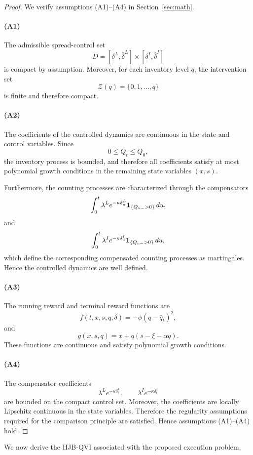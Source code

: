 \documentclass[12pt]{article}
\begin{document}
\begin{proof}
We verify assumptions (A1)--(A4) in Section~\ref{sec:math}.

\paragraph{(A1)}
The admissible spread-control set
\[
D=
[\underline\delta^L,\overline\delta^L]
\times
[\underline\delta^I,\overline\delta^I]
\]
is compact by assumption.
Moreover, for each inventory level $q$, the intervention set
\[
\mathcal Z(q)
=
\{0,1,\ldots,q\}
\]
is finite and therefore compact.

\paragraph{(A2)}
The coefficients of the controlled dynamics are continuous in the state and control variables.
Since
\[
0\le Q_t\le Q_0,
\]
the inventory process is bounded, and therefore all coefficients satisfy at most polynomial growth conditions in the remaining state variables $(x,s)$.

Furthermore, the counting processes are characterized through the compensators
\[
\int_0^t
\lambda^L e^{-\kappa\delta^L_u}
{\bf 1}_{\{Q_{u-}>0\}}
\,du,
\]
and
\[
\int_0^t
\lambda^I e^{-\kappa\delta^I_u}
{\bf 1}_{\{Q_{u-}>0\}}
\,du,
\]
which define the corresponding compensated counting processes as martingales.
Hence the controlled dynamics are well defined.

\paragraph{(A3)}
The running reward and terminal reward functions are
\[
f(t,x,s,q,\delta)
=
-\phi(q-\bar q_t)^2,
\]
and
\[
g(x,s,q)
=
x+q(s-\xi-\alpha q).
\]
These functions are continuous and satisfy polynomial growth conditions.

\paragraph{(A4)}
The compensator coefficients
\[
\lambda^L e^{-\kappa\delta^L_t},
\qquad
\lambda^I e^{-\kappa\delta^I_t}
\]
are bounded on the compact control set.
Moreover, the coefficients are locally Lipschitz continuous in the state variables.
Therefore the regularity assumptions required for the comparison principle are satisfied.
Hence assumptions (A1)--(A4) hold.
\end{proof}
We now derive the HJB-QVI associated with the proposed execution problem.
\end{document}
